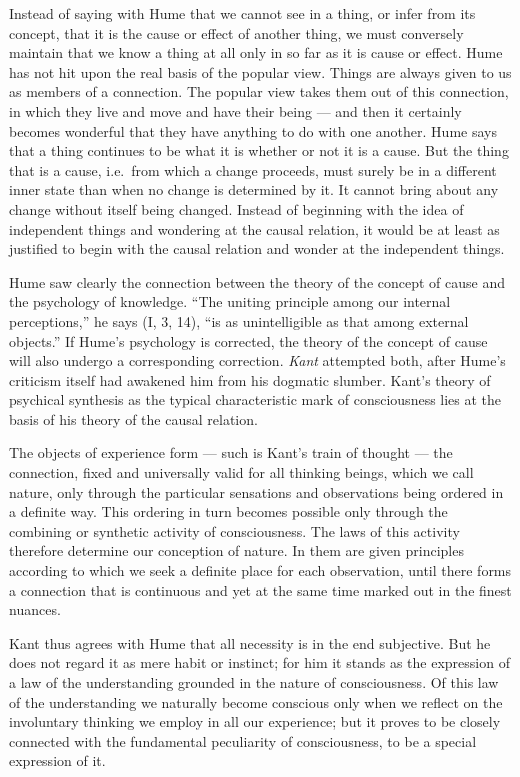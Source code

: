 \documentclass[12pt,a4paper]{book}
\newcommand{\opage}[1]{\marginnote{\footnotesize\textit{[#1]}}}
\begin{document}
Instead of saying with Hume that we cannot see in a thing, or infer from
its concept, that it is the cause or effect of another thing, we must
conversely maintain that we know a thing at all only in so far as it is
cause or effect. Hume has not hit upon the real basis of the popular
view. Things are always given to us as members of a connection. The
popular view takes them out of this connection, in which they live and
move and have their being --- and then it certainly becomes wonderful
that they have anything to do with one another. Hume says that a thing
continues to be what it is whether or not it is a cause. But the thing
that is a cause, i.e.\ from which a change proceeds, must surely be in a
different inner state than when no change is determined by it. It
cannot bring about
\opage{257}any change without itself being changed. Instead of beginning
with the idea of independent things and wondering at the causal
relation, it would be at least as justified to begin with the causal
relation and wonder at the independent things.

Hume saw clearly the connection between the theory of the concept of
cause and the psychology of knowledge. ``The uniting principle among our
internal perceptions,'' he says (I, 3, 14), ``is as unintelligible as
that among external objects.'' If Hume's psychology is corrected, the
theory of the concept of cause will also undergo a corresponding
correction. \emph{Kant} attempted both, after Hume's criticism itself had
awakened him from his dogmatic slumber. Kant's theory of psychical
synthesis as the typical characteristic mark of consciousness lies at
the basis of his theory of the causal relation.

The objects of experience form --- such is Kant's train of thought ---
the connection, fixed and universally valid for all thinking beings,
which we call nature, only through the particular sensations and
observations being ordered in a definite way. This ordering in turn
becomes possible only through the combining or synthetic activity of
consciousness. The laws of this activity therefore determine our
conception of nature. In them are given principles according to which we
seek a definite place for each observation, until there forms a
connection that is continuous and yet at the same time marked out in the
finest nuances.

Kant thus agrees with Hume that all necessity is in the end subjective.
But he does not regard it as mere habit or instinct; for him it stands as
the expression of a law of the understanding grounded in the nature of
consciousness. Of this law of the understanding we naturally become
conscious only when we reflect on the involuntary thinking we employ in
all our experience; but it proves to be closely connected with the
fundamental peculiarity of consciousness, to be a special expression of
it.
\end{document}
